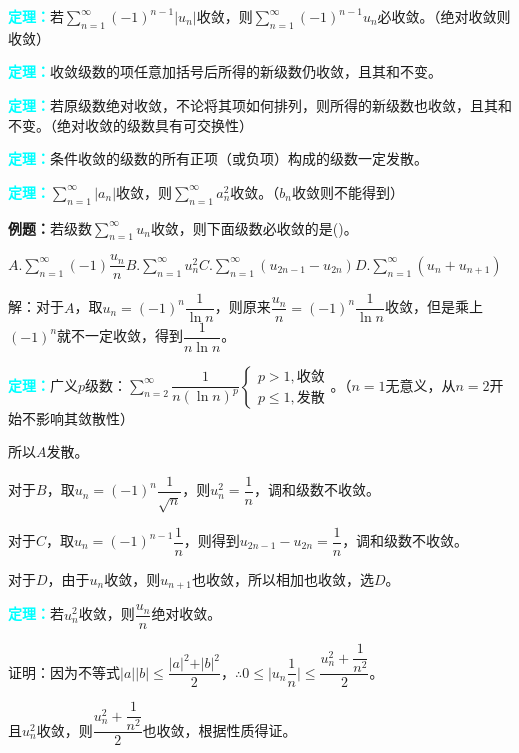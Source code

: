 \textcolor{aqua}{\textbf{定理：}}若$\sum\limits_{n=1}^\infty(-1)^{n-1}\vert u_n\vert$收敛，则$\sum\limits_{n=1}^\infty(-1)^{n-1}u_n$必收敛。（绝对收敛则收敛）

\textcolor{aqua}{\textbf{定理：}}收敛级数的项任意加括号后所得的新级数仍收敛，且其和不变。

\textcolor{aqua}{\textbf{定理：}}若原级数绝对收敛，不论将其项如何排列，则所得的新级数也收敛，且其和不变。（绝对收敛的级数具有可交换性）

\textcolor{aqua}{\textbf{定理：}}条件收敛的级数的所有正项（或负项）构成的级数一定发散。

\textcolor{aqua}{\textbf{定理：}}$\sum\limits_{n=1}^\infty\vert a_n\vert$收敛，则$\sum\limits_{n=1}^\infty a_n^2$收敛。（$b_n$收敛则不能得到）

\textbf{例题：}若级数$\sum\limits_{n=1}^\infty u_n$收敛，则下面级数必收敛的是()。

$A.\sum\limits_{n=1}^\infty(-1)\dfrac{u_n}{n}$\qquad$B.\sum\limits_{n=1}^\infty u_n^2$\qquad$C.\sum\limits_{n=1}^\infty(u_{2n-1}-u_{2n})$\qquad$D.\sum\limits_{n=1}^\infty(u_n+u_{n+1})$

解：对于$A$，取$u_n=(-1)^n\dfrac{1}{\ln n}$，则原来$\dfrac{u_n}{n}=(-1)^n\dfrac{1}{\ln n}$收敛，但是乘上$(-1)^n$就不一定收敛，得到$\dfrac{1}{n\ln n}$。

\textcolor{aqua}{\textbf{定理：}}广义$p$级数：$\sum\limits_{n=2}^\infty\dfrac{1}{n(\ln n)^p}\left\{\begin{array}{l}
    p>1, \text{收敛} \\
    p\leqslant1, \text{发散}
\end{array}\right.$。（$n=1$无意义，从$n=2$开始不影响其敛散性）

所以$A$发散。

对于$B$，取$u_n=(-1)^n\dfrac{1}{\sqrt{n}}$，则$u_n^2=\dfrac{1}{n}$，调和级数不收敛。

对于$C$，取$u_n=(-1)^{n-1}\dfrac{1}{n}$，则得到$u_{2n-1}-u_{2n}=\dfrac{1}{n}$，调和级数不收敛。

对于$D$，由于$u_n$收敛，则$u_{n+1}$也收敛，所以相加也收敛，选$D$。

\textcolor{aqua}{\textbf{定理：}}若$u_n^2$收敛，则$\dfrac{u_n}{n}$绝对收敛。

证明：因为不等式$\vert a\vert\vert b\vert\leqslant\dfrac{\vert a\vert^2+\vert b\vert^2}{2}$，$\therefore0\leqslant\vert u_n\dfrac{1}{n}\vert\leqslant\dfrac{u_n^2+\dfrac{1}{n^2}}{2}$。

且$u_n^2$收敛，则$\dfrac{u_n^2+\dfrac{1}{n^2}}{2}$也收敛，根据性质得证。

